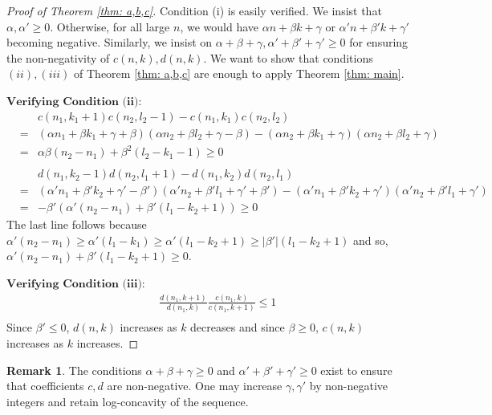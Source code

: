 \documentclass{article}
\theoremstyle{definition}
\newtheorem*{remark}{Remark}
\numberwithin{equation}{section}
\begin{document}
\begin{proof}[Proof of Theorem \ref{thm: a,b,c}]
    Condition (i) is easily verified.
    We insist that $\alpha, \alpha'\ge 0$. Otherwise, for all large $n$, we would have $\alpha n +\beta k+\gamma$ or $\alpha'n+\beta' k+\gamma'$ becoming negative. Similarly, we insist on $\alpha+\beta+\gamma, \alpha'+\beta'+\gamma'\ge 0$ for ensuring the non-negativity of $c(n,k),d(n,k)$. We want to show that conditions $(ii), (iii)$ of Theorem \ref{thm: a,b,c} are enough to apply Theorem \ref{thm: main}. 
    
    $\textbf{Verifying Condition (ii):}$ 
    \begin{eqnarray*}
         &&c(n_1,k_1+1)c(n_2,l_2-1)-c(n_1,k_1)c(n_2,l_2)\\
         &=& (\alpha n_1 +\beta k_1+\gamma+\beta)(\alpha n_2+\beta l_2+\gamma-\beta)-(\alpha n_2+\beta k_1+\gamma)(\alpha n_2+\beta l_2+\gamma)\\
         &=& \alpha\beta (n_2-n_1)+\beta^2(l_2-k_1-1) \ge 0
\\
\\
       &&d(n_1,k_2-1)d(n_2,l_1+1)-d(n_1,k_2)d(n_2,l_1)\\
        &=&(\alpha' n_1+\beta' k_2+\gamma'-\beta')(\alpha'n_2+\beta'l_1+\gamma'+\beta')-(\alpha'n_1+\beta'k_2+\gamma')(\alpha'n_2+\beta'l_1+\gamma')\\
        &=& -\beta' ( \alpha'(n_2-n_1)+ \beta'(l_1-k_2+1)) \ge 0
    \end{eqnarray*}
    The last line follows because $\alpha'(n_2-n_1)\ge\alpha'(l_1-k_1)\ge\alpha'(l_1-k_2+1)\ge|\beta'|(l_1-k_2+1)$ and so, $ \alpha'(n_2-n_1)+ \beta'(l_1-k_2+1)\ge 0$.

    $\textbf{Verifying Condition (iii):}$  
    \begin{eqnarray*}
     &&\frac{d(n_1,k+1)}{d(n_1,k)}\frac{c(n_1,k)}{c(n_1,k+1)}\le 1\\
    \end{eqnarray*}
    Since $\beta'\le 0$, $d(n,k)$ increases as $k$ decreases and since $\beta\ge0$, $c(n,k)$ increases as $k$ increases.
\end{proof}
\begin{remark}
    The conditions $\alpha+\beta+\gamma\ge 0$ and $\alpha'+\beta'+\gamma'\ge 0$ exist to ensure that coefficients $c,d$ are non-negative. One may increase $\gamma,\gamma'$ by non-negative integers and retain log-concavity of the sequence.
\end{remark}
\end{document}

